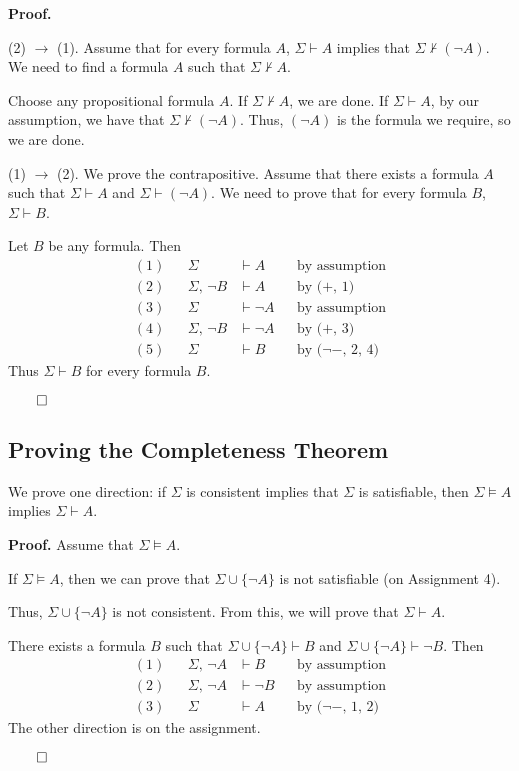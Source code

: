 \documentclass[11pt]{article}
\theoremstyle{definition}
\begin{document}
{\bf Proof.}

(2) $\rightarrow$ (1). Assume that for every formula $A$, $\Sigma \vdash A$ implies that $\Sigma \nvdash (\neg A)$. We need to find a formula $A$ such that $\Sigma \nvdash A$. 

Choose any propositional formula $A$. If $\Sigma \nvdash A$, we are done. If $\Sigma \vdash A$, by our assumption, we have that $\Sigma \nvdash (\neg A)$. Thus, $(\neg A)$ is the formula we require, so we are done.

(1) $\rightarrow$ (2). We prove the contrapositive. Assume that there exists a formula $A$ such that $\Sigma \vdash A$ and $\Sigma \vdash (\neg A)$. We need to prove that for every formula $B$, $\Sigma \vdash B$. 

Let $B$ be any formula. Then
\begin{align*}
    (1) & & \Sigma &\vdash A & & \text{by assumption} \\
    (2) & & \Sigma,\, \neg B &\vdash A & & \text{by ($+$, 1)} \\
    (3) & & \Sigma &\vdash \neg A & & \text{by assumption} \\
    (4) & & \Sigma,\, \neg B &\vdash \neg A & & \text{by ($+$, 3)} \\
    (5) & & \Sigma &\vdash B & & \text{by ($\neg-$, 2, 4)} 
\end{align*}
Thus $\Sigma \vdash B$ for every formula $B$.
\vspace{-1cm} \begin{flushright} $\qed$ \end{flushright}

\subsection{Proving the Completeness Theorem}
We prove one direction: if $\Sigma$ is consistent implies that $\Sigma$ is satisfiable, then $\Sigma \vDash A$ implies $\Sigma \vdash A$. 

{\bf Proof.} Assume that $\Sigma \vDash A$.

If $\Sigma \vDash A$, then we can prove that $\Sigma \cup \{\neg A\}$ is not satisfiable (on Assignment 4).

Thus, $\Sigma \cup \{\neg A\}$ is not consistent. From this, we will prove that $\Sigma \vdash A$. 

There exists a formula $B$ such that $\Sigma \cup \{\neg A\} \vdash B$ and $\Sigma \cup \{\neg A\} \vdash \neg B$. Then
\begin{align*}
    (1) & & \Sigma,\, \neg A &\vdash B & & \text{by assumption} \\
    (2) & & \Sigma,\, \neg A &\vdash \neg B & & \text{by assumption} \\
    (3) & & \Sigma &\vdash A & & \text{by ($\neg-$, 1, 2)} 
\end{align*}
The other direction is on the assignment.
\vspace{-1cm} \begin{flushright} $\qed$ \end{flushright}
\end{document}
